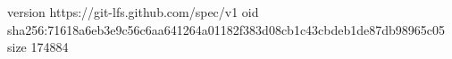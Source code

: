version https://git-lfs.github.com/spec/v1
oid sha256:71618a6eb3e9c56c6aa641264a01182f383d08cb1c43cbdeb1de87db98965c05
size 174884
